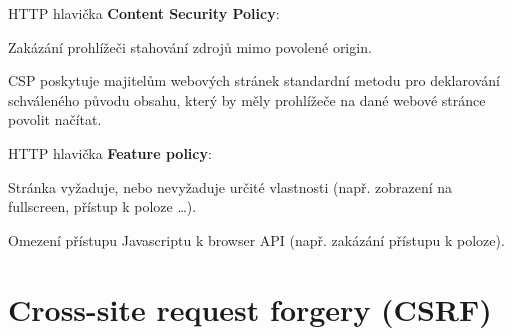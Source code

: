 \begin{compactitem}
\begin{compactitem}
        \item HTTP hlavička \textbf{Content Security Policy}: \begin{compactitem}
            \item Zakázání prohlížeči stahování zdrojů mimo povolené origin.
            \item CSP poskytuje majitelům webových stránek standardní metodu pro deklarování schváleného původu obsahu, který by měly prohlížeče na dané webové stránce povolit načítat.
        \end{compactitem}

        \item HTTP hlavička \textbf{Feature policy}: \begin{compactitem}
            \item Stránka vyžaduje, nebo nevyžaduje určité vlastnosti (např. zobrazení na fullscreen, přístup k poloze \ldots).
            \item Omezení přístupu Javascriptu k browser API (např. zakázání přístupu k poloze).
        \end{compactitem}
    \end{compactitem}
\end{compactitem}


\section{Cross-site request forgery (CSRF)}

